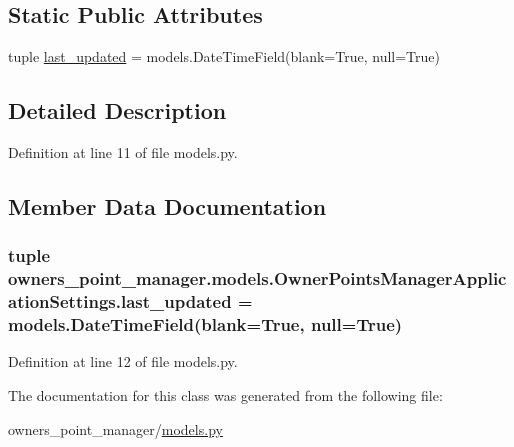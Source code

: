 \subsection*{Static Public Attributes}
\begin{DoxyCompactItemize}
\item 
tuple \hyperlink{classowners__point__manager_1_1models_1_1OwnerPointsManagerApplicationSettings_a25543253fc2677183889201e03af60f4}{last\-\_\-updated} = models.\-Date\-Time\-Field(blank=True, null=True)
\end{DoxyCompactItemize}


\subsection{Detailed Description}


Definition at line 11 of file models.\-py.



\subsection{Member Data Documentation}
\hypertarget{classowners__point__manager_1_1models_1_1OwnerPointsManagerApplicationSettings_a25543253fc2677183889201e03af60f4}{
\subsubsection[{last\-\_\-updated}]{\setlength{\rightskip}{0pt plus 5cm}tuple owners\-\_\-point\-\_\-manager.\-models.\-Owner\-Points\-Manager\-Application\-Settings.\-last\-\_\-updated = models.\-Date\-Time\-Field(blank=True, null=True)\hspace{0.3cm}{\ttfamily [static]}}}\label{classowners__point__manager_1_1models_1_1OwnerPointsManagerApplicationSettings_a25543253fc2677183889201e03af60f4}


Definition at line 12 of file models.\-py.



The documentation for this class was generated from the following file\-:\begin{DoxyCompactItemize}
\item 
owners\-\_\-point\-\_\-manager/\hyperlink{owners__point__manager_2models_8py}{models.\-py}\end{DoxyCompactItemize}
